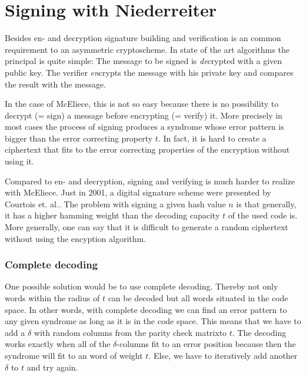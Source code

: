 

\section{Signing with Niederreiter}
\label{signature}
Besides en- and decryption signature building and verification is an common requirement to an asymmetric cryptoscheme. In state of the art algorithms the principal is quite simple: The message to be signed is \textit{de}crypted with a given public key. The verifier \textit{en}crypts the message with his private key and compares the result with the message. 

In the case of McEliece, this is not so easy because there is no possibility to decrypt (= sign) a message before encrypting (= verify) it. More precisely in most cases the process of signing produces a syndrome whose  error pattern is bigger than the error correcting property $t$. In fact, it is hard to create a ciphertext that fits to the error correcting properties of the encryption without using it. 


Compared to en- and decryption, signing and verifying is much harder to realize with McEliece. Just in 2001, a digital signature scheme were presented by Courtois et. al.\cite{courtois2001achieve}. The problem with signing a given hash value $n$ is that generally, it has a higher hamming weight than the decoding capacity $t$ of the used code is. More generally, one can say that it is difficult to generate a random ciphertext without using the encyption algorithm. 


\subsubsection*{Complete decoding}
One possible solution would be to use complete decoding. Thereby not only words within the radius of $t$ can be decoded but all words situated in the code space. In other words, with complete decoding we can find an error pattern to any given syndrome as long as it is in the code space. This means that we have to add a $\delta$ with random columns from the parity check matrixto $t$. The decoding works exactly when all of the $\delta$-columns fit to an error position because then the syndrome will fit to an word of weight $t$. Else, we have to iteratively add another $\delta$ to $t$ and try again.

